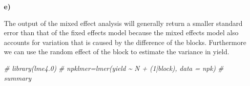 \documentclass[
]{article}
\newenvironment{Shaded}{\begin{snugshade}}{\end{snugshade}}
\newcommand{\CommentTok}[1]{\textcolor[rgb]{0.56,0.35,0.01}{\textit{#1}}}
\begin{document}
\textbf{e)}

The output of the mixed effect analysis will generally return a smaller
standard error than that of the fixed effects model because the mixed
effects model also accounts for variation that is caused by the
difference of the blocks. Furthermore we can use the random effect of
the block to estimate the variance in yield.

\begin{Shaded}
\begin{Highlighting}[]
\CommentTok{\# library(lme4.0)}
\CommentTok{\# npklmer=lmer(yield \textasciitilde{} N + (1|block), data = npk)}
\CommentTok{\# summary}
\end{Highlighting}
\end{Shaded}
\end{document}

